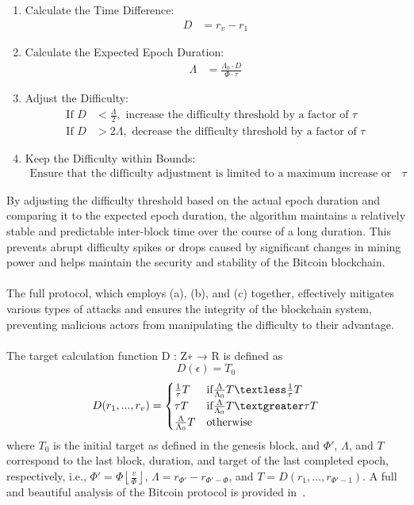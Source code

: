 \documentclass{report}
\begin{document}
\begin{enumerate}
	\item Calculate the Time Difference:
	\begin{align*}
		D &= r_v - r_1
	\end{align*}
	
	\item Calculate the Expected Epoch Duration:
	\begin{align*}
		\Lambda &= \frac{\Lambda_0 \cdot D}{\Phi \cdot \tau}
	\end{align*}
	
	\item Adjust the Difficulty:
	\begin{align*}
		\text{If } D &< \frac{\Lambda}{2}, \text{ increase the difficulty threshold by a factor of }\tau \\
		\text{If } D &> 2 \Lambda, \text{ decrease the difficulty threshold by a factor of }\tau
	\end{align*}
	
	\item Keep the Difficulty within Bounds:
	\begin{align*}
		\text{Ensure that the difficulty adjustment is limited to a maximum increase or decrease of a factor of }\tau
	\end{align*}
\end{enumerate}
By adjusting the difficulty threshold based on the actual epoch duration and comparing it to the expected epoch duration, the algorithm maintains a relatively stable and predictable inter-block time over the course of a long duration. This prevents abrupt difficulty spikes or drops caused by significant changes in mining power and helps maintain the security and stability of the Bitcoin blockchain.\\\\
The full protocol, which employs (a), (b), and (c) together, effectively mitigates various types of attacks and ensures the integrity of the blockchain system, preventing malicious actors from manipulating the difficulty to their advantage.\\\\
The target calculation function D : Z∗ → R is defined as
\begin{equation*}
	D(\epsilon) = T_0
\end{equation*}
\[
D(r_{1}, ..., r_{v})=\begin{cases}
	\frac{1}{\tau}T & \text{if} \frac{\Lambda}{\Lambda_0}T \textless \frac{1}{\tau}T \\
	\tau T & \text{if} \frac{\Lambda}{\Lambda_0}T  \textgreater \tau T\\
	\frac{\Lambda}{\Lambda_0}T & \text{otherwise}
\end{cases}
\]
where $T_0$ is the initial target as defined in the genesis block, and $\Phi'$, $\Lambda$, and $T$ correspond to the last block, duration, and target of the last completed epoch, respectively, i.e., $\Phi' = \Phi\left\lfloor\frac{v}{\Phi}\right\rfloor$, $\Lambda = r_{\Phi'} - r_{\Phi'-\Phi}$, and $T = D(r_1,\dots,r_{\Phi'-1})$. A full and beautiful analysis of the Bitcoin protocol is provided in~\cite{reference2}.
\end{document}
